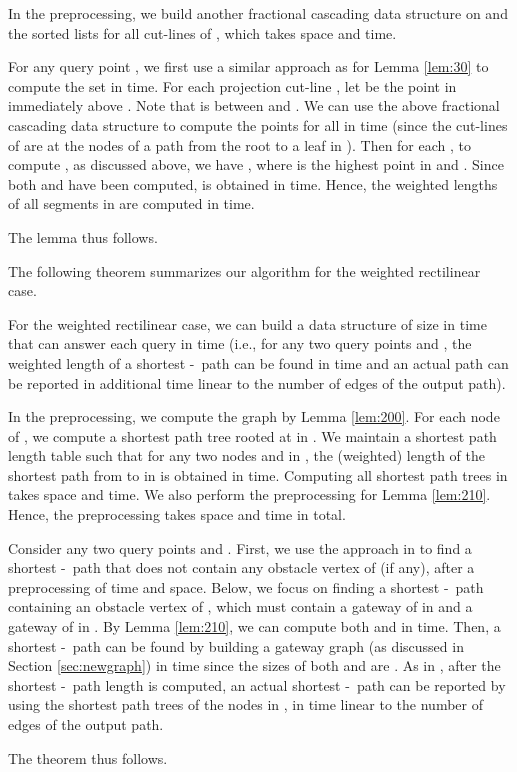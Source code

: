 \documentclass[english,runningheads,11pt]{llncs}
\def\st{-}
\newenvironment{proof}{\noindent {\textbf{Proof:}}\rm}{\hfill \rm}
\begin{document}
\begin{proof}
In the preprocessing, we build another fractional cascading data structure on 
and the sorted lists  for all cut-lines  of , which takes  space and  time.

For any query point , we first use a similar approach as for Lemma \ref{lem:30} to compute
the set  in  time. For each projection cut-line , let 
be the point in  immediately above . Note that  is between 
and . We can use the above fractional cascading data structure to compute the points
 for all  in  time (since the cut-lines of  are at the nodes
of a path from the root to a leaf in ). Then for each , to compute
, as discussed above, we have  , where  is the highest
point in  and .
Since both  and  have been computed,  is obtained
in  time. Hence, the weighted lengths of all segments in  are computed in  time.

The lemma thus follows.
\end{proof}

The following theorem summarizes our algorithm for the weighted rectilinear case.

\begin{theorem}\label{theo:30}
For the weighted rectilinear case, we can build a data structure of
size  in  time that can answer each query in  time (i.e., for
any two query points  and , the weighted length of a shortest \st\ path can be found in 
time and an actual path can be reported in additional time linear to the number of edges of the output path).
\end{theorem}
\begin{proof}
In the preprocessing, we compute the graph  by Lemma \ref{lem:200}. For each node
 of , we compute a shortest path tree rooted at  in . We maintain
a shortest path length table such that for any two nodes  and  in , the
(weighted) length of the shortest path from  to  in  is obtained in  time.
Computing all shortest path trees in  takes
 space and  time. We also
perform the preprocessing for Lemma \ref{lem:210}. Hence, the preprocessing takes
 space and  time in total.

Consider any two query points  and . First, we use the approach in \cite{ref:ChenSh00}
to find a shortest \st\ path that does not contain any obstacle vertex of  (if any),
after a preprocessing of  time and space. Below, we focus on finding a shortest \st\
path containing an obstacle vertex of , which must contain a gateway of  in
 and a gateway of  in . By Lemma \ref{lem:210}, we
can compute both  and  in  time. Then, a
shortest \st\ path can be found by building a gateway graph (as discussed in
Section \ref{sec:newgraph}) in  time since the sizes of both 
and  are . As in \cite{ref:ChenSh00}, after the shortest
\st\ path length is computed, an actual shortest \st\ path can be reported by using the shortest
path trees of the nodes in , in time linear to the number of edges of the output path.

The theorem thus follows.
\end{proof}
\end{document}
